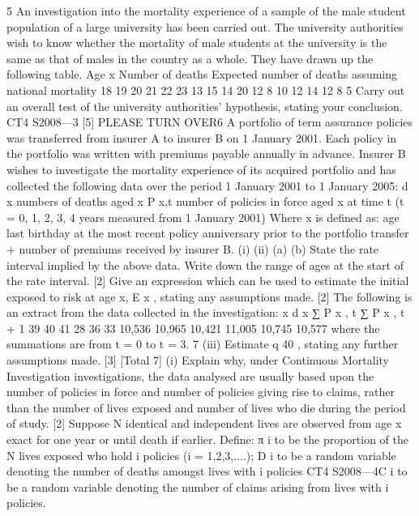 \documentclass[a4paper,12pt]{article}
\begin{document}
\begin{enumerate}
[Total 5]5
An investigation into the mortality experience of a sample of the male student
population of a large university has been carried out. The university authorities wish
to know whether the mortality of male students at the university is the same as that of
males in the country as a whole. They have drawn up the following table.
Age x Number of deaths Expected number
of deaths assuming
national mortality
18
19
20
21
22
23 13
15
14
20
12
8 10
12
14
12
8
5
Carry out an overall test of the university authorities’ hypothesis, stating your
conclusion.
CT4 S2008—3
[5]
PLEASE TURN OVER6
A portfolio of term assurance policies was transferred from insurer A to insurer B on
1 January 2001. Each policy in the portfolio was written with premiums payable
annually in advance. Insurer B wishes to investigate the mortality experience of its
acquired portfolio and has collected the following data over the period 1 January 2001
to 1 January 2005:
d x numbers of deaths aged x
P x,t number of policies in force aged x at time t (t = 0, 1, 2, 3, 4 years measured
from 1 January 2001)
Where x is defined as:
age last birthday at the most recent policy anniversary prior to the portfolio
transfer + number of premiums received by insurer B.
(i)
(ii)
(a)
(b)
State the rate interval implied by the above data.
Write down the range of ages at the start of the rate interval.
[2]
Give an expression which can be used to estimate the initial exposed to risk at
age x, E x , stating any assumptions made.
[2]
The following is an extract from the data collected in the investigation:
x d x ∑ P x , t ∑ P x , t + 1
39
40
41 28
36
33 10,536
10,965
10,421 11,005
10,745
10,577
where the summations are from t = 0 to t = 3.
7
(iii) Estimate q 40 , stating any further assumptions made.
[3]
[Total 7]
(i) Explain why, under Continuous Mortality Investigation investigations, the
data analysed are usually based upon the number of policies in force and
number of policies giving rise to claims, rather than the number of lives
exposed and number of lives who die during the period of study.
[2]
Suppose N identical and independent lives are observed from age x exact for one year
or until death if earlier.
Define:
π i to be the proportion of the N lives exposed who hold i policies (i = 1,2,3,....);
D i to be a random variable denoting the number of deaths amongst lives with i
policies
CT4 S2008—4C i to be a random variable denoting the number of claims arising from lives with i
policies.


\end{enumerate}
\end{document}

